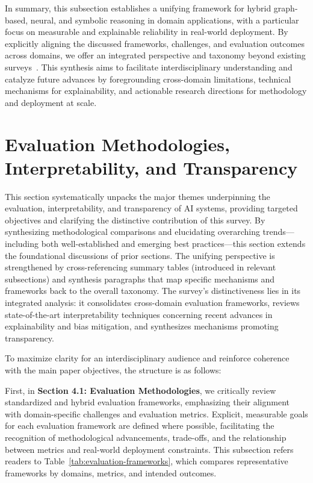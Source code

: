 \documentclass[sigconf]{acmart}
\begin{document}
In summary, this subsection establishes a unifying framework for hybrid graph-based, neural, and symbolic reasoning in domain applications, with a particular focus on measurable and explainable reliability in real-world deployment. By explicitly aligning the discussed frameworks, challenges, and evaluation outcomes across domains, we offer an integrated perspective and taxonomy beyond existing surveys~\cite{ref49,ref50,ref55}. This synthesis aims to facilitate interdisciplinary understanding and catalyze future advances by foregrounding cross-domain limitations, technical mechanisms for explainability, and actionable research directions for methodology and deployment at scale.

\section{Evaluation Methodologies, Interpretability, and Transparency}

This section systematically unpacks the major themes underpinning the evaluation, interpretability, and transparency of AI systems, providing targeted objectives and clarifying the distinctive contribution of this survey. By synthesizing methodological comparisons and elucidating overarching trends—including both well-established and emerging best practices—this section extends the foundational discussions of prior sections. The unifying perspective is strengthened by cross-referencing summary tables (introduced in relevant subsections) and synthesis paragraphs that map specific mechanisms and frameworks back to the overall taxonomy. The survey’s distinctiveness lies in its integrated analysis: it consolidates cross-domain evaluation frameworks, reviews state-of-the-art interpretability techniques concerning recent advances in explainability and bias mitigation, and synthesizes mechanisms promoting transparency.

To maximize clarity for an interdisciplinary audience and reinforce coherence with the main paper objectives, the structure is as follows: 

First, in \textbf{Section 4.1: Evaluation Methodologies}, we critically review standardized and hybrid evaluation frameworks, emphasizing their alignment with domain-specific challenges and evaluation metrics. Explicit, measurable goals for each evaluation framework are defined where possible, facilitating the recognition of methodological advancements, trade-offs, and the relationship between metrics and real-world deployment constraints. This subsection refers readers to Table~\ref{tab:evaluation-frameworks}, which compares representative frameworks by domains, metrics, and intended outcomes.
\end{document}
